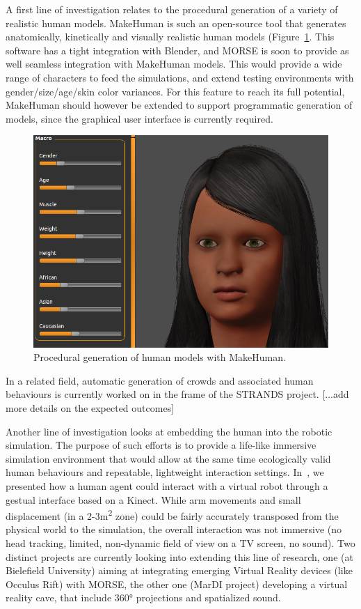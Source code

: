 \documentclass[conference]{IEEEtran}
\begin{document}
A first line of investigation relates to the procedural generation of a variety
of realistic human models. {\sc MakeHuman} is such an open-source tool that
generates anatomically, kinetically and visually realistic human models
(Figure~\ref{fig:makehuman}. This software has a tight integration with Blender,
and MORSE is soon to provide as well seamless integration with {\sc MakeHuman}
models. This would provide a wide range of characters to feed the simulations,
and extend testing environments with gender/size/age/skin color variances.  For
this feature to reach its full potential, {\sc MakeHuman} should however be
extended to support programmatic generation of models, since the graphical user
interface is currently required.

\begin{figure}[tb]
  \centering
  \includegraphics[width=.9\columnwidth]{figs/makehuman.png}
  \caption{Procedural generation of human models with {\sc MakeHuman}.}
  \label{fig:makehuman}
\end{figure}

In a related field, automatic generation of crowds and associated human
behaviours is currently worked on in the frame of the STRANDS project.
[...add more details on the expected outcomes]

Another line of investigation looks at embedding the human into the robotic
simulation. The purpose of such efforts is to provide a life-like immersive
simulation environment that would allow at the same time ecologically valid
human behaviours and repeatable, lightweight interaction settings.
In~\cite{lemaignan2012morse}, we presented how a human agent could interact with
a virtual robot through a gestual interface based on a Kinect. While arm
movements and small displacement (in a 2-3m\textsuperscript{2} zone) could be fairly
accurately transposed from the physical world to the simulation, the overall
interaction was not immersive (no head tracking, limited, non-dynamic field of
view on a TV screen, no sound). Two distinct projects are currently looking into
extending this line of research, one (at Bielefield University) aiming at
integrating emerging Virtual Reality devices (like Occulus Rift) with MORSE, the
other one (MarDI project) developing a virtual reality cave, that include 360°
projections and spatialized sound.
\end{document}

